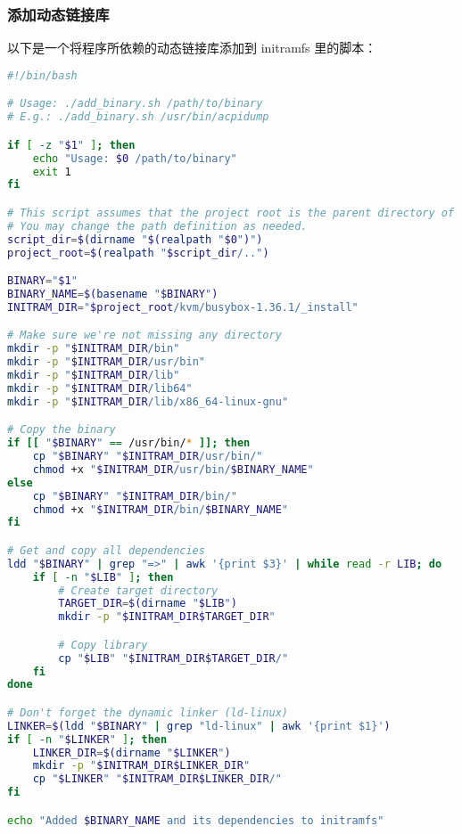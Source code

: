\subsubsection{添加动态链接库}\label{appendix:dynamic-library}
以下是一个将程序所依赖的动态链接库添加到 initramfs 里的脚本：
\begin{lstlisting}[language=bash]
#!/bin/bash

# Usage: ./add_binary.sh /path/to/binary
# E.g.: ./add_binary.sh /usr/bin/acpidump

if [ -z "$1" ]; then
	echo "Usage: $0 /path/to/binary"
	exit 1
fi

# This script assumes that the project root is the parent directory of the script.
# You may change the path definition as needed.
script_dir=$(dirname "$(realpath "$0")")
project_root=$(realpath "$script_dir/..")

BINARY="$1"
BINARY_NAME=$(basename "$BINARY")
INITRAM_DIR="$project_root/kvm/busybox-1.36.1/_install"

# Make sure we're not missing any directory
mkdir -p "$INITRAM_DIR/bin"
mkdir -p "$INITRAM_DIR/usr/bin"
mkdir -p "$INITRAM_DIR/lib"
mkdir -p "$INITRAM_DIR/lib64"
mkdir -p "$INITRAM_DIR/lib/x86_64-linux-gnu"

# Copy the binary
if [[ "$BINARY" == /usr/bin/* ]]; then
	cp "$BINARY" "$INITRAM_DIR/usr/bin/"
	chmod +x "$INITRAM_DIR/usr/bin/$BINARY_NAME"
else
	cp "$BINARY" "$INITRAM_DIR/bin/"
	chmod +x "$INITRAM_DIR/bin/$BINARY_NAME"
fi

# Get and copy all dependencies
ldd "$BINARY" | grep "=>" | awk '{print $3}' | while read -r LIB; do
	if [ -n "$LIB" ]; then
		# Create target directory
		TARGET_DIR=$(dirname "$LIB")
		mkdir -p "$INITRAM_DIR$TARGET_DIR"

		# Copy library
		cp "$LIB" "$INITRAM_DIR$TARGET_DIR/"
	fi
done

# Don't forget the dynamic linker (ld-linux)
LINKER=$(ldd "$BINARY" | grep "ld-linux" | awk '{print $1}')
if [ -n "$LINKER" ]; then
	LINKER_DIR=$(dirname "$LINKER")
	mkdir -p "$INITRAM_DIR$LINKER_DIR"
	cp "$LINKER" "$INITRAM_DIR$LINKER_DIR/"
fi

echo "Added $BINARY_NAME and its dependencies to initramfs"
\end{lstlisting}